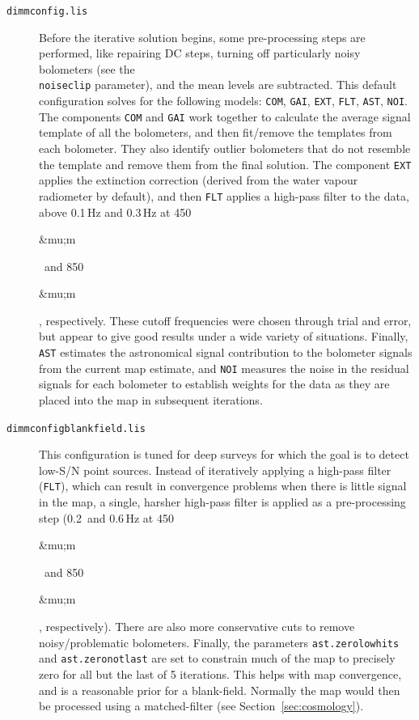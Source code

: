 \documentclass[twoside,11pt]{article}
\newcommand{\micron}{\mbox{\,${\umu}$m}}            %
\renewcommand{\_}{\texttt{\symbol{95}}}
\renewcommand{\micron}{\begin{rawhtml}&mu;m\end{rawhtml}}
\begin{document}
\begin{description}

\item[\texttt{dimmconfig.lis}]\quad Before the iterative solution
  begins, some pre-processing steps are performed, like repairing DC
  steps, turning off particularly noisy bolometers (see the \\
  \texttt{noiseclip} parameter), and the mean levels are subtracted.
  This default configuration solves for the following models:
  \texttt{COM}, \texttt{GAI}, \texttt{EXT}, \texttt{FLT},
  \texttt{AST}, \texttt{NOI}. The components \texttt{COM} and
  \texttt{GAI} work together to calculate the average signal template
  of all the bolometers, and then fit/remove the templates from each
  bolometer. They also identify outlier bolometers that do not
  resemble the template and remove them from the final solution. The
  component \texttt{EXT} applies the extinction correction (derived
  from the water vapour radiometer by default), and then \texttt{FLT}
  applies a high-pass filter to the data, above 0.1\,Hz and 0.3\,Hz at
  450\micron\ and 850\micron, respectively. These cutoff frequencies
  were chosen through trial and error, but appear to give good results
  under a wide variety of situations. Finally, \texttt{AST} estimates
  the astronomical signal contribution to the bolometer signals from
  the current map estimate, and \texttt{NOI} measures the noise in the
  residual signals for each bolometer to establish weights for the
  data as they are placed into the map in subsequent iterations.

\item[\texttt{dimmconfig\_blank\_field.lis}]\quad This configuration
  is tuned for deep surveys for which the goal is to detect low-S/N
  point sources. Instead of iteratively applying a high-pass filter
  (\texttt{FLT}), which can result in convergence problems when there
  is little signal in the map, a single, harsher high-pass filter is
  applied as a pre-processing step (0.2\, and 0.6\,Hz at 450\micron\
  and 850\micron, respectively). There are also more conservative cuts
  to remove noisy/problematic bolometers. Finally, the parameters
  \texttt{ast.zero\_lowhits} and \texttt{ast.zero\_notlast} are set to
  constrain much of the map to precisely zero for all but the last of
  5 iterations. This helps with map convergence, and is a reasonable
  prior for a blank-field. Normally the map would then be processed
  using a matched-filter (see Section~\ref{sec:cosmology}).


\end{description}
\end{document}
